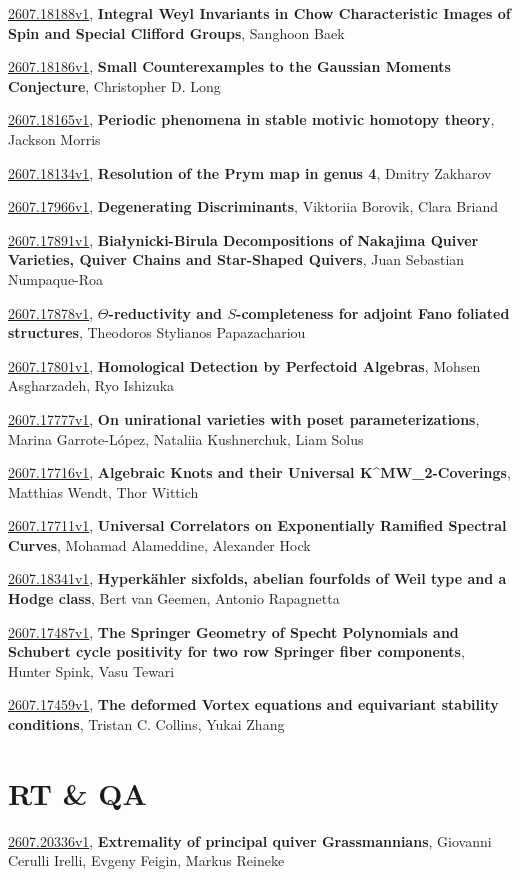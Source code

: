 \documentclass[9pt, a4paper]{article}
\theoremstyle{plain}
\theoremstyle{definition}
\theoremstyle{remark}
\newcommand{\arxiv}[3]{\href{https://arxiv.org/abs/#1}{#1}, \textbf{\textcolor{arxivblue}{#2}}, #3}
\begin{document}
\arxiv{2607.18188v1}{Integral Weyl Invariants in Chow Characteristic Images of Spin and Special Clifford Groups}{Sanghoon Baek}

\arxiv{2607.18186v1}{Small Counterexamples to the Gaussian Moments Conjecture}{Christopher D. Long}

\arxiv{2607.18165v1}{Periodic phenomena in stable motivic homotopy theory}{Jackson Morris}

\arxiv{2607.18134v1}{Resolution of the Prym map in genus 4}{Dmitry Zakharov}

\arxiv{2607.17966v1}{Degenerating Discriminants}{Viktoriia Borovik, Clara Briand}

\arxiv{2607.17891v1}{Białynicki-Birula Decompositions of Nakajima Quiver Varieties, Quiver Chains and Star-Shaped Quivers}{Juan Sebastian Numpaque-Roa}

\arxiv{2607.17878v1}{$Θ$-reductivity and $S$-completeness for adjoint Fano foliated structures}{Theodoros Stylianos Papazachariou}

\arxiv{2607.17801v1}{Homological Detection by Perfectoid Algebras}{Mohsen Asgharzadeh, Ryo Ishizuka}

\arxiv{2607.17777v1}{On unirational varieties with poset parameterizations}{Marina Garrote-López, Nataliia Kushnerchuk, Liam Solus}

\arxiv{2607.17716v1}{Algebraic Knots and their Universal K^MW_2-Coverings}{Matthias Wendt, Thor Wittich}

\arxiv{2607.17711v1}{Universal Correlators on Exponentially Ramified Spectral Curves}{Mohamad Alameddine, Alexander Hock}

\arxiv{2607.18341v1}{Hyperkähler sixfolds, abelian fourfolds of Weil type and a Hodge class}{Bert van Geemen, Antonio Rapagnetta}

\arxiv{2607.17487v1}{The Springer Geometry of Specht Polynomials and Schubert cycle positivity for two row Springer fiber components}{Hunter Spink, Vasu Tewari}

\arxiv{2607.17459v1}{The deformed Vortex equations and equivariant stability conditions}{Tristan C. Collins, Yukai Zhang}


\section{RT \& QA}
\arxiv{2607.20336v1}{Extremality of principal quiver Grassmannians}{Giovanni Cerulli Irelli, Evgeny Feigin, Markus Reineke}
\end{document}
